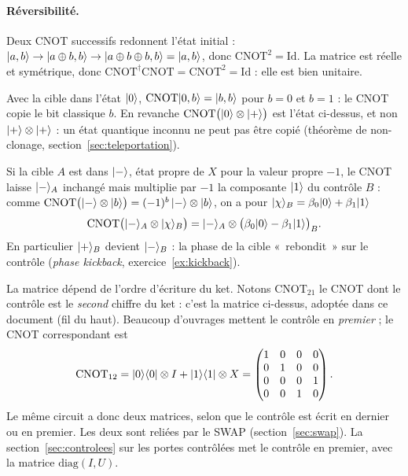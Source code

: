 \paragraph{Réversibilité.} Deux CNOT successifs redonnent l'état initial :
$|a,b\rangle\to|a\oplus b,b\rangle\to|a\oplus b\oplus b,b\rangle=|a,b\rangle$, donc
$\mathrm{CNOT}^2=\mathrm{Id}$. La matrice est réelle et symétrique, donc
$\mathrm{CNOT}^\dagger\mathrm{CNOT}=\mathrm{CNOT}^2=\mathrm{Id}$ : elle est bien unitaire.

\begin{remarque}
Avec la cible dans l'état $|0\rangle$, $\mathrm{CNOT}|0,b\rangle=|b,b\rangle$ pour $b=0$ et $b=1$ : le CNOT
copie le bit classique $b$. En revanche $\mathrm{CNOT}\big(|0\rangle\otimes|+\rangle\big)$ est l'état
ci-dessus, et non $|+\rangle\otimes|+\rangle$ : un état quantique inconnu ne peut pas être copié
(théorème de non-clonage, section~\ref{sec:teleportation}).
\end{remarque}

\begin{remarque}\label{rem:kickback}
Si la cible $A$ est dans $|-\rangle$, état propre de $X$ pour la valeur propre $-1$, le CNOT laisse
$|-\rangle_A$ inchangé mais multiplie par $-1$ la composante $|1\rangle$ du contrôle $B$ : comme
$\mathrm{CNOT}\big(|-\rangle\otimes|b\rangle\big)=(-1)^{b}\,|-\rangle\otimes|b\rangle$, on a pour
$|\chi\rangle_B=\beta_0|0\rangle+\beta_1|1\rangle$
\[
  \mathrm{CNOT}\big(|-\rangle_A\otimes|\chi\rangle_B\big)=|-\rangle_A\otimes\big(\beta_0|0\rangle-\beta_1|1\rangle\big)_B .
\]
En particulier $|+\rangle_B$ devient $|-\rangle_B$ : la phase de la cible «~rebondit~» sur le contrôle
(\emph{phase kickback}, exercice~\ref{ex:kickback}).
\end{remarque}

\begin{remarque}
La matrice dépend de l'ordre d'écriture du ket. Notons $\mathrm{CNOT}_{21}$ le CNOT dont le
contrôle est le \emph{second} chiffre du ket : c'est la matrice ci-dessus, adoptée dans ce
document (fil du haut). Beaucoup d'ouvrages mettent le contrôle en \emph{premier} ; le CNOT
correspondant est
\[
  \mathrm{CNOT}_{12}=|0\rangle\langle 0|\otimes I+|1\rangle\langle 1|\otimes X
  =\begin{pmatrix}1&0&0&0\\0&1&0&0\\0&0&0&1\\0&0&1&0\end{pmatrix}.
\]
Le même circuit a donc deux matrices, selon que le contrôle est écrit en dernier ou en premier.
Les deux sont reliées par le SWAP (section~\ref{sec:swap}). La section~\ref{sec:controlees} sur les
portes contrôlées met le contrôle en premier, avec la matrice $\mathrm{diag}(I,U)$.
\end{remarque}

